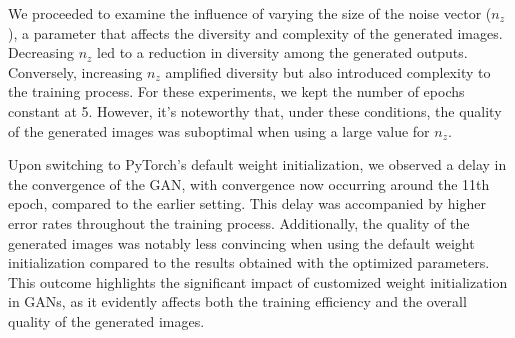 We proceeded to examine the influence of varying the size of the noise vector ($n_z$), a parameter that affects the diversity and complexity of the generated images. Decreasing $n_z$ led to a reduction in diversity among the generated outputs. Conversely, increasing $n_z$ amplified diversity but also introduced complexity to the training process. For these experiments, we kept the number of epochs constant at 5. However, it's noteworthy that, under these conditions, the quality of the generated images was suboptimal when using a large value for $n_z$.

Upon switching to PyTorch's default weight initialization, we observed a delay in the convergence of the GAN, with convergence now occurring around the 11th epoch, compared to the earlier setting. This delay was accompanied by higher error rates throughout the training process. Additionally, the quality of the generated images was notably less convincing when using the default weight initialization compared to the results obtained with the optimized parameters. This outcome highlights the significant impact of customized weight initialization in GANs, as it evidently affects both the training efficiency and the overall quality of the generated images.





